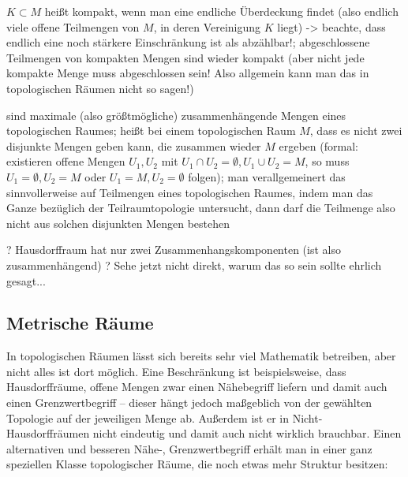\documentclass[../H_Analysis_main.tex]{subfiles}
\begin{document}
\begin{defi}[Kompaktheit]

\end{defi}

$K \subset M$ heißt kompakt, wenn man eine endliche Überdeckung findet (also endlich viele offene Teilmengen von $M$, in deren Vereinigung $K$ liegt) -> beachte, dass endlich eine noch stärkere Einschränkung ist als abzählbar!; abgeschlossene Teilmengen von kompakten Mengen sind wieder kompakt (aber nicht jede kompakte Menge muss abgeschlossen sein! Also allgemein kann man das in topologischen Räumen nicht so sagen!)



\begin{defi}[Zusammenhang]%

\end{defi}

 sind maximale (also größtmögliche) zusammenhängende Mengen eines topologischen Raumes;  heißt bei einem topologischen Raum $M$, dass es nicht zwei disjunkte Mengen geben kann, die zusammen wieder $M$ ergeben (formal: existieren offene Mengen $U_1, U_2$ mit $U_1 \cap U_2 = \emptyset, U_1 \cup U_2 = M$, so muss $U_1 = \emptyset, U_2 = M$ oder $U_1 = M, U_2 = \emptyset$ folgen); man verallgemeinert das sinnvollerweise auf Teilmengen eines topologischen Raumes, indem man das Ganze bezüglich der Teilraumtopologie untersucht, dann darf die Teilmenge also nicht aus solchen disjunkten Mengen bestehen

? Hausdorffraum hat nur zwei Zusammenhangskomponenten (ist also zusammenhängend) ? Sehe jetzt nicht direkt, warum das so sein sollte ehrlich gesagt...



		\subsection{Metrische Räume}
In topologischen Räumen lässt sich bereits sehr viel Mathematik betreiben, aber nicht alles ist dort möglich. Eine Beschränkung ist beispielsweise, dass Hausdorffräume, offene Mengen zwar einen Nähebegriff liefern und damit auch einen Grenzwertbegriff -- dieser hängt jedoch maßgeblich von der gewählten Topologie auf der jeweiligen Menge ab. Außerdem ist er in Nicht-Hausdorffräumen nicht eindeutig und damit auch nicht wirklich brauchbar. Einen alternativen und besseren Nähe-, Grenzwertbegriff erhält man in einer ganz speziellen Klasse topologischer Räume, die noch etwas mehr Struktur besitzen:
\end{document}
